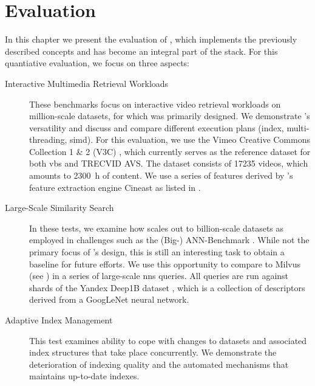 \chapter{Evaluation}
\label{chapter:evaluation}

In this chapter we present the evaluation of \cottontail{} \cite{Gasser:2020Cottontail}, which implements the previously described concepts and has become an integral part of the \vitrivr{} \cite{Rossetto:2016vitrivr,Gasser:2019Towards,Gasser:2019Multimodal} stack. For this quantiative evaluation, we focus on three aspects:

\begin{description}
    \item[Interactive Multimedia Retrieval Workloads] These benchmarks focus on interactive video retrieval workloads on million-scale datasets, for which \cottontail{} was primarily designed. We demonstrate \cottontail{}'s versatility and discuss and compare different execution plans (index, multi-threading, \acrshort{simd}). For this evaluation, we use the Vimeo Creative Commons Collection 1 \& 2 (V3C) \cite{Berns:2019V3C1,Rossetto:2021Insights}, which currently serves as the reference dataset for both \acrshort{vbs} and TRECVID AVS. The dataset consists of 17235 videos, which amounts to \SI{2300}{\hour} of content. We use a series of features derived by \vitrivr{}'s feature extraction engine Cineast as listed in .
    \item[Large-Scale Similarity Search] In these tests, we examine how \cottontail{} scales out to billion-scale datasets as employed in challenges such as the (Big-) ANN-Benchmark \cite{Aumueller:2017ANN,Simhadri:2022Results}. While not the primary focus of \cottontail{}'s design, this is still an interesting task to obtain a baseline for future efforts. We use this opportunity to compare \cottontail{} to Milvus (see ) in a series of large-scale \acrshort{nns} queries. All queries are run against shards of the Yandex Deep1B dataset \cite{Babenko:2016Efficient}, which is a collection of descriptors derived from a GoogLeNet \cite{Szegedy:2015Going} neural network.
    \item[Adaptive Index Management] This test examines \cottontail{} ability to cope with changes to datasets and associated index structures that take place concurrently. We demonstrate the deterioration of indexing quality and the automated mechanisms that maintains up-to-date indexes.
\end{description}

